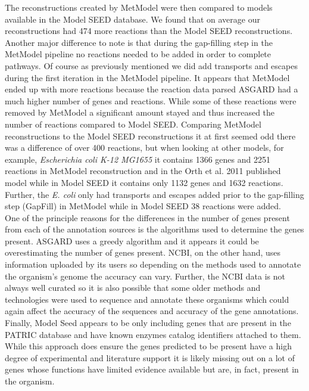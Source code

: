\indent The reconstructions created by MetModel were then compared to models available in the Model SEED database. We found that on average our reconstructions had 474 more reactions than the Model SEED reconstructions.  Another major difference to note is that during the gap-filling step in the MetModel pipeline no reactions needed to be added in order to complete pathways. Of course as previously mentioned we did add transports and escapes during the first iteration in the MetModel pipeline. It appears that MetModel ended up with more reactions because the reaction data parsed ASGARD had a much higher number of genes and reactions. While some of these reactions were removed by MetModel a significant amount stayed and thus increased the number of reactions compared to Model SEED. Comparing MetModel reconstructions to the Model SEED reconstructions it at first seemed odd there was a difference of over 400 reactions, but when looking at other models, for example, \textit{Escherichia coli K-12 MG1655} it contains 1366 genes and 2251 reactions in MetModel reconstruction and in the Orth et al. 2011 published model while in Model SEED it contains only 1132 genes and 1632 reactions. Further, the \textit{E. coli} only had transports and escapes added prior to the gap-filling step (GapFill) in MetModel while in Model SEED 38 reactions were added\citep{brooks_gap_2012}.\\
\indent One of the principle reasons for the differences in the number of genes present from each of the annotation sources is the algorithms used to determine the genes present. ASGARD uses a greedy algorithm and it appears it could be overestimating the number of genes present.  NCBI, on the other hand, uses information uploaded by its users so depending on the methods used to annotate the organism's genome the accuracy can vary.  Further, the NCBI data is not always well curated so it is also possible that some older methods and technologies were used to sequence and annotate these organisms which could again affect the accuracy of the sequences and accuracy of the gene annotations.  Finally, Model Seed appears to be only including genes that are present in the PATRIC database and have known enzymes catalog identifiers attached to them.  While this approach does ensure the genes predicted to be present have a high degree of experimental and literature support it is likely missing out on a lot of genes whose functions have limited evidence available but are, in fact, present in the organism.
%

